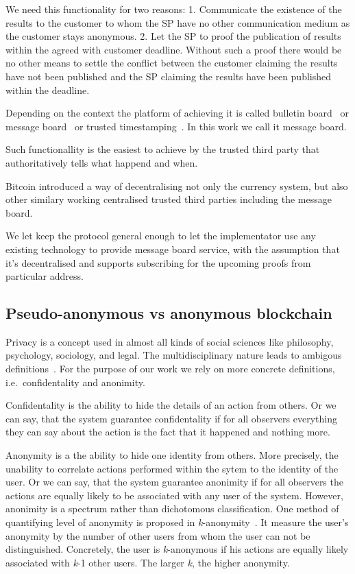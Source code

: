 \documentclass{ieeeaccess}
\begin{document}
We need this functionality for two reasons: 1. Communicate the existence
of the results to the customer to whom the SP have no other
communication medium as the customer stays anonymous. 2. Let the SP to
proof the publication of results within the agreed with customer
deadline. Without such a proof there would be no other means to settle
the conflict between the customer claiming the results have not been
published and the SP claiming the results have been published within the
deadline.

Depending on the context the platform of achieving it is called bulletin
board~\cite{achenbach2015improved} or message board~\cite{hinarejos2019solution} or trusted timestamping~\cite{gipp2015decentralized}. In this work we call it message board.

Such functionallity is the easiest to achieve by the trusted third party
that authoritatively tells what happend and when.

Bitcoin introduced a way of decentralising not only the currency system,
but also other similary working centralised trusted third parties
including the message board.

We let keep the protocol general enough to let the implementator use any
existing technology to provide message board service, with the
assumption that it's decentralised and supports subscribing for the
upcoming proofs from particular address.



\subsection{Pseudo-anonymous vs anonymous blockchain} 

Privacy is a concept used in almost all kinds of social sciences like philosophy, psychology, sociology, and legal. The multidisciplinary nature leads to ambigous definitions~\cite{smith2011information}. For the purpose of our work we rely on more concrete definitions, i.e.~confidentality and anonimity.

Confidentality is the ability to hide the details of an action from others. Or we can say, that the system guarantee confidentality if for all observers everything they can say about the action is the fact that it happened and nothing more.

Anonymity is a the ability to hide one identity from others. More precisely, the unability to correlate actions performed within the sytem to the identity of the user. Or we can say, that the system guarantee anonimity if for all observers the actions are equally likely to be associated with any user of the system. However, anonimity is a spectrum rather than dichotomous classification. One method of quantifying level of anonymity is proposed in \textit{k}-anonymity~\cite{sweeney2002k}. It measure the user's anonymity by the number of other users from whom the user can not be distinguished. Concretely, the user is \textit{k}-anonymous if his actions are equally likely associated with \textit{k}-1 other users. The larger \textit{k}, the higher anonymity.
\end{document}
